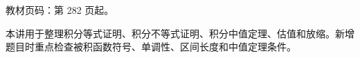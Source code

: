 
\begin{knowledgeBox}
教材页码：第 282 页起。

本讲用于整理积分等式证明、积分不等式证明、积分中值定理、估值和放缩。新增题目时重点检查被积函数符号、单调性、区间长度和中值定理条件。
\end{knowledgeBox}
